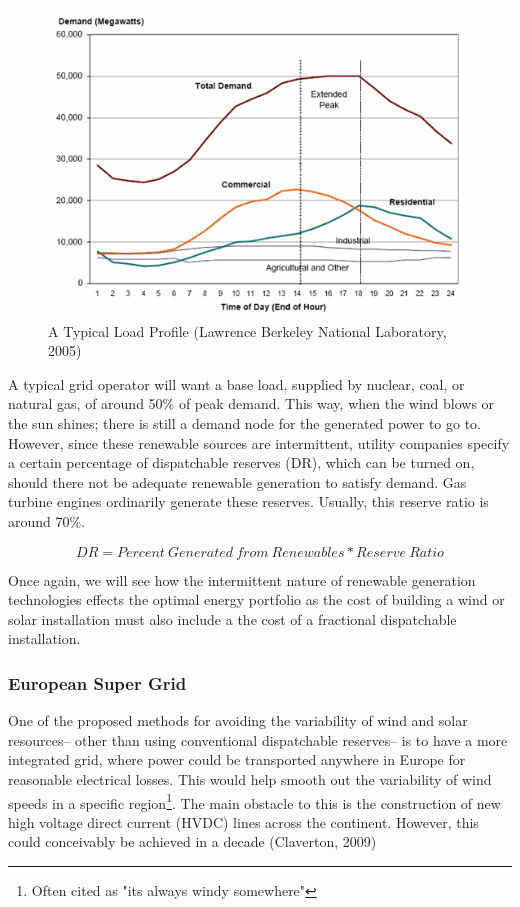 \documentclass{article}
\begin{document}
\begin{figure}[H]
	\begin{center}
	\includegraphics[scale = .75]{Figures/elec_load_demand.png}
	\caption{A Typical Load Profile (Lawrence Berkeley National Laboratory, 2005)}
	\end{center}
\end{figure}


A typical grid operator will want a base load, supplied by nuclear, coal, or natural gas, of around 50\% of peak demand. This way, when the wind blows or the sun shines; there is still a demand node for the generated power to go to. However, since these renewable sources are intermittent, utility companies specify a certain percentage of dispatchable reserves (DR), which can be turned on, should there not be adequate renewable generation to satisfy demand. Gas turbine engines ordinarily generate these reserves. Usually, this reserve ratio is around 70\%. 

\begin{equation}
	DR = Percent\: Generated\: from\: Renewables * Reserve\: Ratio
\end{equation}

Once again, we will see how the intermittent nature of renewable generation technologies effects the optimal energy portfolio as the cost of building a wind or solar installation must also include a the cost of a fractional dispatchable installation.

\subsubsection{European Super Grid}
One of the proposed methods for avoiding the variability of wind and solar resources-- other than using conventional dispatchable reserves-- is to have a more integrated grid, where power could be transported anywhere in Europe for reasonable electrical losses. This would help smooth out the variability of wind speeds in a specific region\footnote{Often cited as "its always windy somewhere"}. The main obstacle to this is the construction of new high voltage direct current (HVDC) lines across the continent. However, this could conceivably be achieved in a decade (Claverton, 2009)
\end{document}
